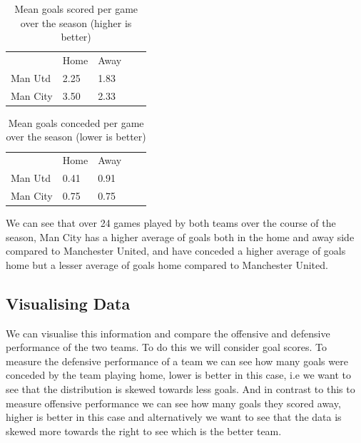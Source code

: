 \documentclass[11pt]{report}
\begin{document}
\begin{table}[ht]
\centering
\caption{Mean goals scored per game over the season (higher is better)}
\begin{tabular}{lllll}
         & Home & Away &  &  \\
Man Utd  & 2.25 & 1.83 &  &  \\
Man City & 3.50 & 2.33 &  &  \\
\end{tabular}
\end{table}

\begin{table}[ht]
\centering
\caption{Mean goals conceded per game over the season (lower is better)}
\begin{tabular}{lllll}
         & Home & Away &  &  \\
Man Utd  & 0.41 & 0.91 &  &  \\
Man City & 0.75 & 0.75 &  &  \\
\end{tabular}
\end{table}

\noindent
We can see that over 24 games played by both teams over the course of the season, Man City has a higher average of goals both in the home and away side compared to Manchester United, and have conceded a higher average of goals home but a lesser average of goals home compared to Manchester United. 

\newpage

\subsection{Visualising Data}
\vspace{0.3cm}
We can visualise this information and compare the offensive and defensive performance of the two teams. To do this we will consider goal scores. To measure the defensive performance of a team we can see how many goals were conceded by the team playing home, lower is better in this case, i.e we want to see that the distribution is skewed towards less goals. And in contrast to this to measure offensive performance we can see how many goals they scored away, higher is better in this case and alternatively we want to see that the data is skewed more towards the right to see which is the better team. 
\end{document}
